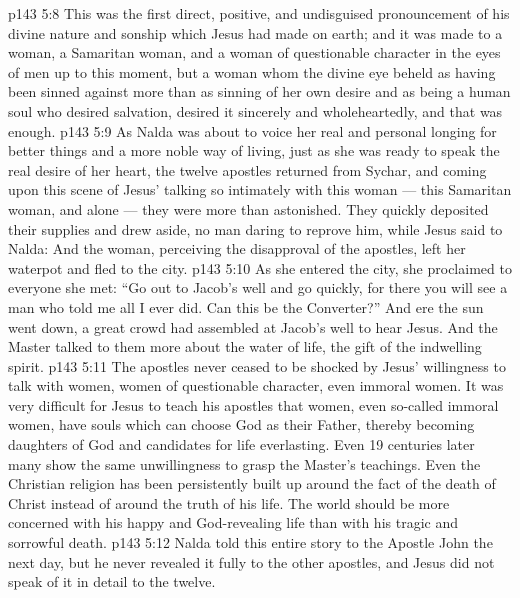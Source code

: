 \vs p143 5:8 This was the first direct, positive, and undisguised pronouncement of his divine nature and sonship which Jesus had made on earth; and it was made to a woman, a Samaritan woman, and a woman of questionable character in the eyes of men up to this moment, but a woman whom the divine eye beheld as having been sinned against more than as sinning of her own desire and as  being a human soul who desired salvation, desired it sincerely and wholeheartedly, and that was enough.
\vs p143 5:9 As Nalda was about to voice her real and personal longing for better things and a more noble way of living, just as she was ready to speak the real desire of her heart, the twelve apostles returned from Sychar, and coming upon this scene of Jesus’ talking so intimately with this woman --- this Samaritan woman, and alone --- they were more than astonished. They quickly deposited their supplies and drew aside, no man daring to reprove him, while Jesus said to Nalda:  And the woman, perceiving the disapproval of the apostles, left her waterpot and fled to the city.
\vs p143 5:10 As she entered the city, she proclaimed to everyone she met: “Go out to Jacob’s well and go quickly, for there you will see a man who told me all I ever did. Can this be the Converter?” And ere the sun went down, a great crowd had assembled at Jacob’s well to hear Jesus. And the Master talked to them more about the water of life, the gift of the indwelling spirit.
\vs p143 5:11 The apostles never ceased to be shocked by Jesus’ willingness to talk with women, women of questionable character, even immoral women. It was very difficult for Jesus to teach his apostles that women, even so\hyp{}called immoral women, have souls which can choose God as their Father, thereby becoming daughters of God and candidates for life everlasting. Even 19 centuries later many show the same unwillingness to grasp the Master’s teachings. Even the Christian religion has been persistently built up around the fact of the death of Christ instead of around the truth of his life. The world should be more concerned with his happy and God\hyp{}revealing life than with his tragic and sorrowful death.
\vs p143 5:12 Nalda told this entire story to the Apostle John the next day, but he never revealed it fully to the other apostles, and Jesus did not speak of it in detail to the twelve.
